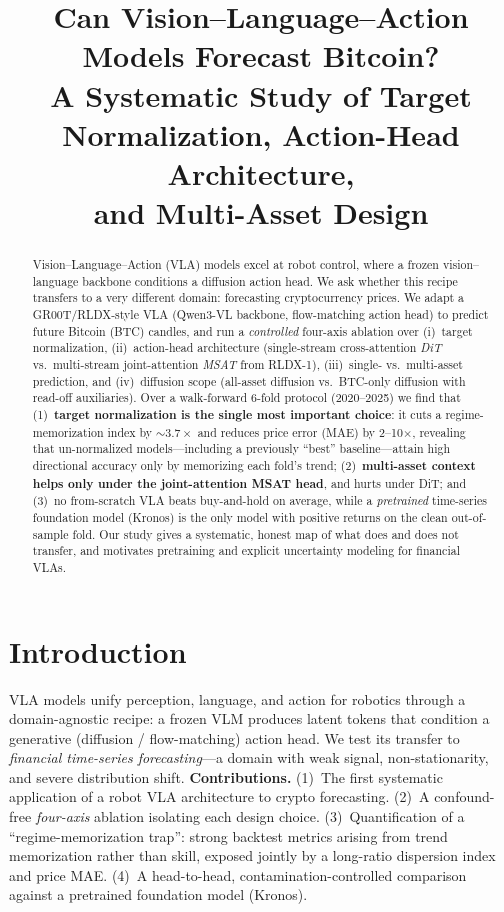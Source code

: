 \documentclass[10pt]{article}
\title{\vspace{-2.5em}\textbf{Can Vision--Language--Action Models Forecast Bitcoin?\\
A Systematic Study of Target Normalization, Action-Head Architecture,\\ and Multi-Asset Design}}
\author{}
\date{}
\begin{document}
\maketitle
\vspace{-3.5em}

\begin{abstract}
\noindent
Vision--Language--Action (VLA) models excel at robot control, where a frozen vision--language
backbone conditions a diffusion action head. We ask whether this recipe transfers to a very
different domain: forecasting cryptocurrency prices. We adapt a GR00T/RLDX-style VLA
(Qwen3-VL backbone, flow-matching action head) to predict future Bitcoin (BTC) candles, and run
a \emph{controlled} four-axis ablation over (i)~target normalization, (ii)~action-head
architecture (single-stream cross-attention \emph{DiT} vs.\ multi-stream joint-attention
\emph{MSAT} from RLDX-1), (iii)~single- vs.\ multi-asset prediction, and (iv)~diffusion scope
(all-asset diffusion vs.\ BTC-only diffusion with read-off auxiliaries). Over a walk-forward
6-fold protocol (2020--2025) we find that (1)~\textbf{target normalization is the single most
important choice}: it cuts a regime-memorization index by ${\sim}3.7\times$ and reduces
price error (MAE) by 2--10$\times$, revealing that un-normalized models---including a previously
``best'' baseline---attain high directional accuracy only by memorizing each fold's trend;
(2)~\textbf{multi-asset context helps only under the joint-attention MSAT head}, and hurts under
DiT; and (3)~no from-scratch VLA beats buy-and-hold on average, while a \emph{pretrained}
time-series foundation model (Kronos) is the only model with positive returns on the clean
out-of-sample fold. Our study gives a systematic, honest map of what does and does not transfer,
and motivates pretraining and explicit uncertainty modeling for financial VLAs.
\end{abstract}

\vspace{-0.5em}
\section{Introduction}
VLA models unify perception, language, and action for robotics through a domain-agnostic recipe:
a frozen VLM produces latent tokens that condition a generative (diffusion / flow-matching)
action head. We test its transfer to \emph{financial time-series forecasting}---a domain with
weak signal, non-stationarity, and severe distribution shift.
\textbf{Contributions.} (1)~The first systematic application of a robot VLA architecture to
crypto forecasting. (2)~A confound-free \emph{four-axis} ablation isolating each design choice.
(3)~Quantification of a ``regime-memorization trap'': strong backtest metrics arising from trend
memorization rather than skill, exposed jointly by a long-ratio dispersion index and price MAE.
(4)~A head-to-head, contamination-controlled comparison against a pretrained foundation model
(Kronos).
\end{document}

